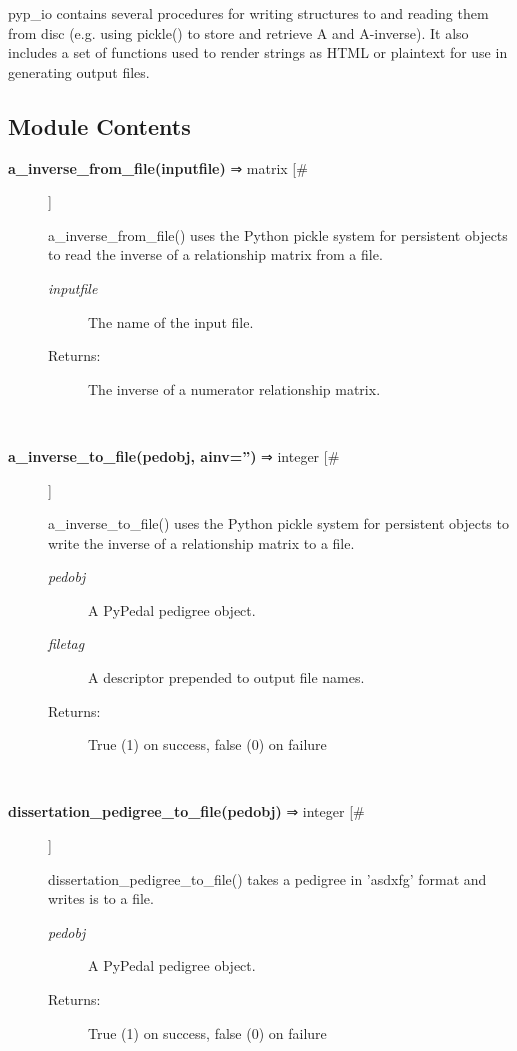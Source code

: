 

 pyp\_io contains several procedures for writing structures to and reading them from disc (e.g. using pickle() to store and retrieve A and A-inverse). It also includes a set of functions used to render strings as HTML or plaintext for use in generating output files.
\subsection*{Module Contents}
\begin{description}
\item[\textbf{a\_inverse\_from\_file(inputfile)}
 ⇒ matrix [\#]]

 a\_inverse\_from\_file() uses the Python pickle system for persistent objects to read the inverse of a relationship matrix from a file.
\begin{description}
\item[\emph{inputfile}
] The name of the input file.
\item[Returns:] The inverse of a numerator relationship matrix.

\end{description}
\\ 

\item[\textbf{a\_inverse\_to\_file(pedobj, ainv='')}
 ⇒ integer [\#]]

 a\_inverse\_to\_file() uses the Python pickle system for persistent objects to write the inverse of a relationship matrix to a file.
\begin{description}
\item[\emph{pedobj}
] A PyPedal pedigree object.
\item[\emph{filetag}
] A descriptor prepended to output file names.
\item[Returns:] True (1) on success, false (0) on failure

\end{description}
\\ 

\item[\textbf{dissertation\_pedigree\_to\_file(pedobj)}
 ⇒ integer [\#]]

 dissertation\_pedigree\_to\_file() takes a pedigree in 'asdxfg' format and writes is to a file.
\begin{description}
\item[\emph{pedobj}
] A PyPedal pedigree object.
\item[Returns:] True (1) on success, false (0) on failure


\end{description}
\end{description}
